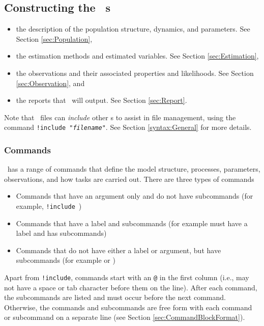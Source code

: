 \subsection{Constructing the \CNAME\ \config s \label{ConstructingConfig}}

\begin{itemize}
	\item the description of the population structure, dynamics, and parameters. See Section \ref{sec:Population},
	\item the estimation methods and estimated variables. See Section \ref{sec:Estimation},
	\item the observations and their associated properties and likelihoods. See Section \ref{sec:Observation}, and
	\item the reports that \CNAME\ will output. See Section \ref{sec:Report}.
\end{itemize}

Note that \config\ files can \emph{include} other \config s to assist in file management, using the command \texttt{!include "\emph{filename}"}. See Section \ref{syntax:General} for more details.

\subsubsection{Commands}

\CNAME\ has a range of commands that define the model structure, processes, parameters, observations, and how tasks are carried out. There are three types of commands

\begin{itemize}
	\item Commands that have an argument only and do not have subcommands (for example, \texttt{!include}\ )
	\item Commands that have a label and subcommands (for example  must have a label and has subcommands)
	\item Commands that do not have either a label or argument, but have subcommands (for example  or )
\end{itemize}

Apart from \texttt{!include}, commands start with an \texttt{@} in the first column (i.e., may not have a space or tab character before them on the line). After each command, the subcommands are listed and must occur before the next command. Otherwise, the commands and subcommands are free form with each command or subcommand on a separate line (see Section \ref{sec:CommandBlockFormat}).

